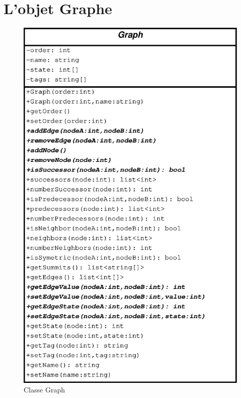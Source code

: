 \documentclass[11pt,a4paper]{article}
\begin{document}
	\section{L'objet Graphe}
		\begin{figure}[htbp]
			\begin{center}
				\includegraphics[scale=0.3]{class_graph.eps}
			\end{center}
			\caption{Classe Graph}
			\label{img_graph_class}
		\end{figure}
		
\end{document}
